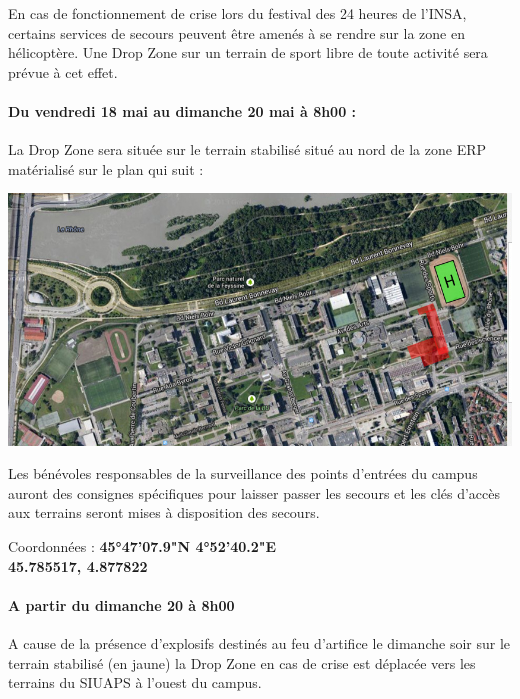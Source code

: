 \documentclass[hidelinks, paper=a4, fontsize=13pt]{report}
\begin{document}
En cas de fonctionnement de crise lors du festival des 24 heures de l’INSA, certains services de secours peuvent être amenés à se rendre sur la zone en hélicoptère. 
Une Drop Zone sur un terrain de sport libre de toute activité sera prévue à cet effet. 

\paragraph{Du vendredi 18 mai au dimanche 20 mai à 8h00 :}

La Drop Zone sera située sur le terrain stabilisé situé au nord de la zone ERP matérialisé sur le plan qui suit :

\begin{center}
	\includegraphics[scale=0.4]{Annexes/Plans/dropZone}
\end{center}

Les bénévoles responsables de la surveillance des points d’entrées du campus auront des consignes spécifiques pour laisser passer les secours et les clés d’accès aux terrains seront mises à disposition des secours.

\begin{center}
	Coordonnées : \textbf{45°47'07.9"N 4°52'40.2"E}\\
	\textbf{45.785517, 4.877822}
\end{center}

\paragraph{A partir du dimanche 20 à 8h00}
A cause de la présence d’explosifs destinés au feu d’artifice le dimanche soir sur le terrain stabilisé (en jaune) la Drop Zone en cas de crise est déplacée vers les terrains du SIUAPS à l’ouest du campus.
\end{document}
